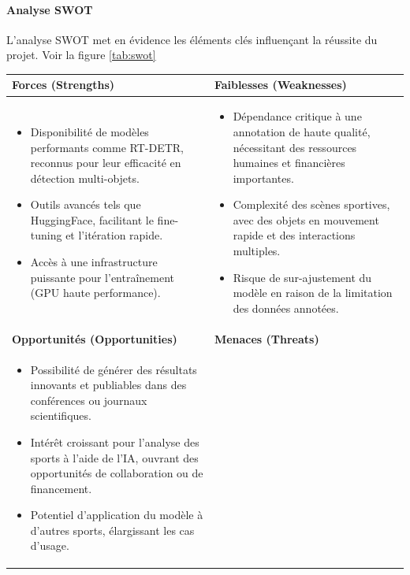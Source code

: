     \paragraph{Analyse SWOT}
    L’analyse SWOT met en évidence les éléments clés influençant la réussite du projet. Voir la figure \ref{tab:swot}
    \begin{table} [!h]
        \centering  
        \begin{tabular}{|p{7cm}|p{7cm}|}  
        \hline  
        \textbf{Forces (Strengths)} & \textbf{Faiblesses (Weaknesses)} \\  
        \hline  
        \begin{itemize}
        \item Disponibilité de modèles performants comme RT-DETR, reconnus pour leur efficacité en détection multi-objets. 
         \item Outils avancés tels que HuggingFace, facilitant le fine-tuning et l’itération rapide. 
         \item Accès à une infrastructure puissante pour l’entraînement (GPU haute performance). 
        \end{itemize}
        & 
        \begin{itemize}
         \item Dépendance critique à une annotation de haute qualité, nécessitant des ressources humaines et financières importantes. 
         \item Complexité des scènes sportives, avec des objets en mouvement rapide et des interactions multiples. 
         \item Risque de sur-ajustement du modèle en raison de la limitation des données annotées. 
        \end{itemize}\\
         \hline  
        \textbf{Opportunités (Opportunities)} & \textbf{Menaces (Threats)} \\  
        \hline  
        \begin{itemize}
            \item Possibilité de générer des résultats innovants et publiables dans des conférences ou journaux scientifiques.   
            \item Intérêt croissant pour l’analyse des sports à l’aide de l’IA, ouvrant des opportunités de collaboration ou de financement.  
            \item Potentiel d’application du modèle à d’autres sports, élargissant les cas d’usage.
        \end{itemize}&

\end{tabular}
\end{table}
